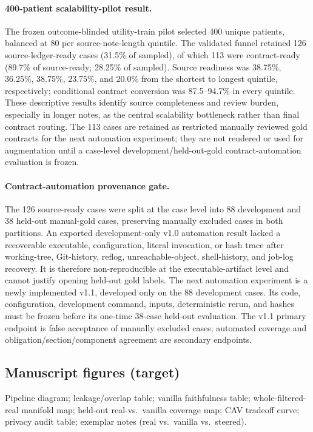 \documentclass[11pt]{article}
\begin{document}
\paragraph{400-patient scalability-pilot result.} The frozen outcome-blinded utility-train pilot selected 400 unique patients, balanced at 80 per source-note-length quintile.  The validated funnel retained 126 source-ledger-ready cases (31.5\% of sampled), of which 113 were contract-ready (89.7\% of source-ready; 28.25\% of sampled).  Source readiness was 38.75\%, 36.25\%, 38.75\%, 23.75\%, and 20.0\% from the shortest to longest quintile, respectively; conditional contract conversion was 87.5--94.7\% in every quintile.  These descriptive results identify source completeness and review burden, especially in longer notes, as the central scalability bottleneck rather than final contract routing.  The 113 cases are retained as restricted manually reviewed gold contracts for the next automation experiment; they are not rendered or used for augmentation until a case-level development/held-out-gold contract-automation evaluation is frozen.

\paragraph{Contract-automation provenance gate.} The 126 source-ready cases were split at the case level into 88 development and 38 held-out manual-gold cases, preserving manually excluded cases in both partitions.  An exported development-only v1.0 automation result lacked a recoverable executable, configuration, literal invocation, or hash trace after working-tree, Git-history, reflog, unreachable-object, shell-history, and job-log recovery.  It is therefore non-reproducible at the executable-artifact level and cannot justify opening held-out gold labels.  The next automation experiment is a newly implemented v1.1, developed only on the 88 development cases.  Its code, configuration, development command, inputs, deterministic rerun, and hashes must be frozen before its one-time 38-case held-out evaluation.  The v1.1 primary endpoint is false acceptance of manually excluded cases; automated coverage and obligation/section/component agreement are secondary endpoints.

\subsection{Manuscript figures (target)}

Pipeline diagram; leakage/overlap table; vanilla faithfulness table; whole-filtered-real manifold map; held-out real-vs.\ vanilla coverage map; CAV tradeoff curve; privacy audit table; exemplar notes (real vs.\ vanilla vs.\ steered).
\end{document}

